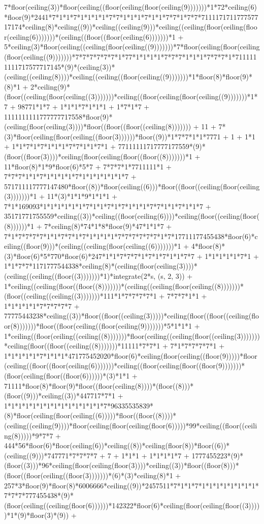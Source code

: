 7*floor(ceiling(3))*floor(ceiling((floor(ceiling(floor(ceiling(9)))))))*1*72*ceiling(6)*floor(9)*2441*7*1*1*7*1*1*1*1*7*7*1*1*1*7*1*1*7*7*1*7*7*711117171177757717174*ceiling(8)*ceiling((9))*ceiling((ceiling(9)))*ceiling((ceiling(floor(ceiling(floor(ceiling(6)))))))*(ceiling((floor((floor(ceiling(6)))))))*1 + 5*ceiling(3)*floor(ceiling((ceiling(floor(ceiling((9)))))))*7*floor(ceiling(floor(ceiling(floor(ceiling((9)))))))*7*7*7*7*7*7*1*77*1*1*1*1*7*7*7*1*1*1*7*7*7*1*7111111111717577717145*(9)*(ceiling(3))*(ceiling((ceiling(8))))*ceiling((ceiling((floor(ceiling((9)))))))*1*floor(8)*floor(9)*(8)*1 + 2*ceiling(9)*(floor((ceiling(floor(ceiling((3)))))))*ceiling((floor(ceiling(floor(ceiling((9)))))))*1*7 + 98771*1*7 + 1*1*1*7*1*1*1 + 1*7*1*7 + 1111111111777777717558*floor(9)*(ceiling(floor(ceiling(3))))*floor((floor((floor((ceiling(8))))))) + 11 + 7*(3)*floor(ceiling(floor(ceiling((floor(3))))))*floor((9))*1*7*7*1*1*7771 + 1 + 1*1 + 1*1*7*1*7*1*1*1*7*7*1*1*7*1 + 77111111717777177559*(9)*(floor((floor(3))))*ceiling(floor(ceiling(floor((floor((8)))))))*1 + 11*floor(8)*1*9*floor(6)*5*7 + 7*7*7*1*7711111*1 + 7*7*7*1*1*7*1*1*1*1*7*1*1*1*1*1*1*7 + 571711117777147480*floor((8))*floor(ceiling((6)))*floor((floor((ceiling(floor(ceiling(3)))))))*1 + 11*(3)*1*1*9*1*1*1 + 7*1*169093*1*1*1*1*1*1*7*1*1*7*1*7*1*1*1*7*7*1*1*7*1*1*7 + 35171771755559*ceiling((3))*ceiling((floor(ceiling(6))))*ceiling(floor((ceiling(floor((8))))))*1 + 7*ceiling(8)*74*1*8*floor(9)*47*1*1*7 + 7*1*7*7*7*7*1*1*7*7*1*7*1*1*1*1*7*7*7*7*7*7*1*7*17711177455438*floor(6)*ceiling((floor(9)))*(ceiling((ceiling(floor(ceiling((6)))))))*1 + 4*floor(8)*(3)*floor(6)*5*770*floor(6)*247*1*1*7*7*7*1*7*1*7*1*1*7*7 + 1*1*1*1*1*7*1 + 1*1*7*7*1171777544338*ceiling(8)*(ceiling(floor(ceiling(3))))*(ceiling((ceiling((floor((3)))))))*1)*integrate(2*s, (s, 2, 3)) + 1*ceiling((ceiling(floor((floor((8)))))))*(ceiling((ceiling(floor(ceiling((8)))))))*(floor((ceiling((ceiling((3)))))))*111*1*7*7*7*7*1 + 7*7*7*1*1 + 1*1*1*1*1*7*7*7*7*7 + 77775443238*ceiling((3))*floor((floor((ceiling(3)))))*ceiling(floor((floor((ceiling(floor(8)))))))*floor((floor(ceiling((floor(ceiling(9)))))))*5*1*1*1 + 1*ceiling((floor(ceiling((ceiling((8)))))))*floor(ceiling((ceiling(floor((ceiling(3)))))))*ceiling(floor((floor((ceiling((8)))))))*11111*7*7*1 + 7*1*7*7*7*7*1 + 1*1*1*1*1*7*1*1*1*471775452020*floor(6)*ceiling(floor(ceiling((floor(9)))))*floor(ceiling((floor((floor(ceiling(6)))))))*ceiling((floor(ceiling(floor((floor(9)))))))*(floor(ceiling(floor((floor(6))))))*(3)*1*1 + 71111*floor(8)*floor(9)*floor((floor(ceiling(8))))*(floor((8)))*(floor((9)))*ceiling((3))*447717*7*1 + 1*1*1*1*1*1*1*1*1*1*1*1*1*1*7*96335535839*(8)*floor(ceiling(floor(ceiling((6)))))*floor((floor((8))))*(ceiling((ceiling(9))))*floor(ceiling(floor(ceiling(floor(6)))))*99*ceiling((floor((ceiling(8)))))*9*7*7 + 444*56*floor(6)*floor(ceiling(6))*ceiling((8))*ceiling(floor(8))*floor((6))*(ceiling((9)))*747771*7*7*7*7 + 7 + 1*1*1 + 1*1*1*1*7 + 1777455223*(9)*(floor((3)))*96*ceiling(floor(ceiling(floor(3))))*ceiling((3))*floor((floor(8)))*(floor((floor(ceiling((floor(3)))))))*(6)*(3)*ceiling(8)*1 + 257*3*floor(9)*floor(8)*6006666*ceiling((9))*2457511*7*1*1*7*1*1*1*1*1*1*1*1*7*7*7*777455438*(9)*(floor(ceiling((ceiling(floor(6))))))*142322*floor(6)*ceiling(floor(ceiling(floor((3)))))*1*(9)*floor(3)*(9)) + 